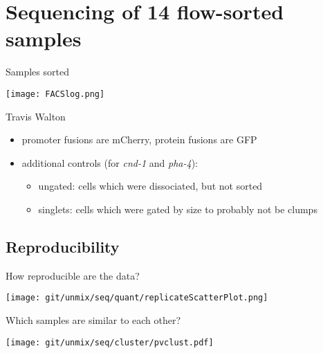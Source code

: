 \documentclass[serif,9pt]{beamer}
\begin{document}
\section{Sequencing of 14 flow-sorted samples}

\begin{frame}{Samples sorted}

\texttt{[image: FACSlog.png]}

\hfill Travis Walton

\begin{itemize}

\item promoter fusions are mCherry, protein fusions are GFP

\item additional controls (for {\em cnd-1} and {\em pha-4}):

\begin{itemize}

\item ungated: cells which were dissociated, but not sorted

\item singlets: cells which were gated by size to probably not be clumps

\end{itemize}

\end{itemize}

\end{frame}

\subsection{Reproducibility}

\begin{frame}{How reproducible are the data?}

\texttt{[image: git/unmix/seq/quant/replicateScatterPlot.png]}

\end{frame}

\begin{frame}{Which samples are similar to each other?}

\texttt{[image: git/unmix/seq/cluster/pvclust.pdf]}

\end{frame}
\end{document}
